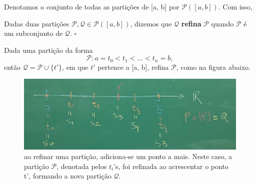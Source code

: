 \documentclass[../analysisII_notes.tex]{subfiles}
\begin{document}
Denotamos o conjunto de todas as partições de [a, b] por \(\mathcal{P}([a, b])\). Com isso,
\begin{def*}
	Dadas duas partições \(\mathcal{P}, \mathcal{Q}\in \mathcal{P}([a, b])\), dizemos que \(\mathcal{Q}\) \textbf{refina} \(\mathcal{P}\) quando \(\mathcal{P}\) é um subconjunto de \(\mathcal{Q}\). \(\square\)
\end{def*}
\begin{example}
	Dada uma partição da forma
	\[
		\mathcal{P}: a = t_{0} < t_{1} < \dotsc < t_{n} = b,
	\]
	então \(\mathcal{Q} = \mathcal{P}\cup \{t'\}\), em que \(t'\) pertence a [a, b], refina \(\mathcal{P}\), como na figura abaixo.
	\begin{figure}[H]
		\begin{center}
			\includegraphics[height=\textheight, width=\textwidth, keepaspectratio]{./Images/partition_03.png}
		\end{center}
		\caption{ao refinar uma partição, adiciona-se um ponto a mais. Neste caso, a partição \(\mathcal{P}\), denotada pelos \(t_{i}\)'s, foi refinada ao acrescentar o ponto t', formando a nova partição \(\mathcal{Q}\).}
		\label{refine03}
	\end{figure}
\end{example}
\end{document}
